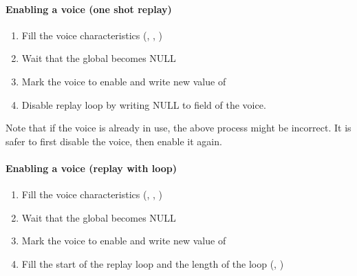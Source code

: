 \paragraph{Enabling a voice (one shot replay)}
\begin{enumerate}
\item Fill the voice characteristics (, , )
\item Wait that the global  becomes NULL
\item Mark the voice to enable and write new value of 
\item Disable replay loop by writing NULL to field  of
  the voice.
\end{enumerate}

Note that if the voice is already in use, the above process might be
incorrect. It is safer to first disable the voice, then enable it
again.

\paragraph{Enabling a voice (replay with loop)}
\begin{enumerate}
\item Fill the voice characteristics (, , )
\item Wait that the global  becomes NULL
\item Mark the voice to enable and write new value of 
\item Fill the start of the replay loop and the length of the loop
  (, )
\end{enumerate}
